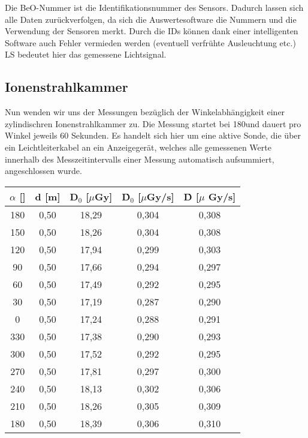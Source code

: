 Die BeO-Nummer ist die Identifikationsnummer des Sensors. Dadurch lassen sich alle Daten zurückverfolgen, da sich die Auswertesoftware die Nummern und die Verwendung der Sensoren merkt. Durch die IDs können dank einer intelligenten Software auch Fehler vermieden werden (eventuell verfrühte Ausleuchtung etc.) LS bedeutet hier das gemessene Lichtsignal.
		
\subsection{Ionenstrahlkammer}

Nun wenden wir uns der Messungen bezüglich der Winkelabhängigkeit einer zylindischren Ionenstrahlkammer zu. Die Messung startet bei 180\textdegree und dauert pro Winkel jeweils 60 Sekunden.
Es handelt sich hier um eine aktive Sonde, die über ein Leichtleiterkabel an ein Anzeigegerät, welches alle gemessenen Werte innerhalb des Messzeitintervalls einer Messung automatisch aufsummiert, angeschlossen wurde.

\vspace{5mm}
	\begin{center}
		\begin{tabular}{c|c|c|c|c}
				\textbf{$\alpha$} [\textdegree] & \textbf{d} [m] & \textbf{D$_0$} [$\mu$Gy] & \textbf{\.D$_0$} [$\mu$Gy/s] & \textbf{\.D} [$\mu$ Gy/s] \\ 
		\hline	180 & 0,50 & 18,29 & 0,304 & 0,308 \\ 
				150 & 0,50 & 18,26 & 0,304 & 0,308 \\ 
				120 & 0,50 & 17,94 & 0,299 & 0,303 \\ 
				90  & 0,50 & 17,66 & 0,294 & 0,297 \\ 
				60  & 0,50 & 17,49 & 0,292 & 0,295 \\ 
				30  & 0,50 & 17,19 & 0,287 & 0,290 \\ 
				0   & 0,50 & 17,24 & 0,288 & 0,291 \\ 
				330 & 0,50 & 17,38 & 0,290 & 0,293 \\ 
				300 & 0,50 & 17,52 & 0,292 & 0,295 \\ 
				270 & 0,50 & 17,81 & 0,297 & 0,300 \\ 
				240 & 0,50 & 18,13 & 0,302 & 0,306 \\ 
			    210 & 0,50 & 18,26 & 0,305 & 0,309 \\ 
		\hline	180 & 0,50 & 18,39 & 0,306 & 0,310 \\ 
		\end{tabular} 
		\label{dft:Winkel}
	\end{center}
\vspace{5mm}				

